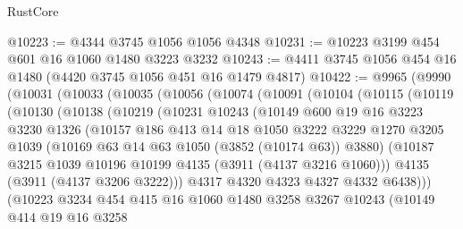 \begin{lexlean}{RustCore}
\begin{coremodule}
@10223 := @4344 @3745 @1056 @1056 @4348
@10231 := @10223 @3199 @454 @601 @16 @1060 @1480 @3223 @3232
@10243 := @4411 @3745 @1056 @454 @16 @1480 (@4420 @3745 @1056 @451 @16 @1479 @4817)
@10422 := @9965
    (@9990
      (@10031
        (@10033
          (@10035
            (@10056
              (@10074
                (@10091
                  (@10104
                    (@10115
                      (@10119
                        (@10130
                          (@10138
                            (@10219
                              (@10231
                                @10243
                                (@10149
                                  @600
                                  @19
                                  @16
                                  @3223
                                  @3230
                                  @1326
                                  (@10157
                                    @186
                                    @413
                                    @14
                                    @18
                                    @1050
                                    @3222
                                    @3229
                                    @1270
                                    @3205
                                    @1039
                                    (@10169 @63 @14 @63 @1050 (@3852 (@10174 @63)) @3880)
                                    (@10187
                                      @3215
                                      @1039
                                      @10196
                                      @10199
                                      @4135
                                      (@3911 (@4137 @3216 @1060)))
                                    @4135
                                    (@3911 (@4137 @3206 @3222)))
                                  @4317
                                  @4320
                                  @4323
                                  @4327
                                  @4332
                                  @6438)))
                            (@10223
                              @3234
                              @454
                              @415
                              @16
                              @1060
                              @1480
                              @3258
                              @3267
                              @10243
                              (@10149
                                @414
                                @19
                                @16
                                @3258

\end{coremodule}
\end{lexlean}
